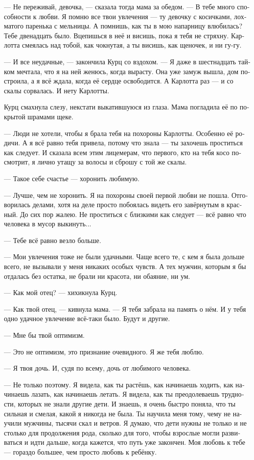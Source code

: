 \documentclass[a4paper,12pt,fleqn]{book}\usepackage{cooltooltips}\usepackage{polyglossia}\setdefaultlanguage[babelshorthands=true]{russian}\setotherlanguage{english}\defaultfontfeatures{Ligatures=TeX,Mapping=tex-text} \usepackage{xcolor}\definecolor{lightgray}{HTML}{bbbbbb}\color{lightgray}\newcommand{\ml}[3]{\textenglish{\textcolor{black}{#3}}}
\begin{document}
--- Не переживай, девочка, --- сказала тогда мама за обедом.
--- В тебе много способности к любви.
Я помню все твои увлечения --- ту девочку с косичками, лохматого паренька с мельницы.
А помнишь, как ты в мою напарницу влюбилась?
Тебе двенадцать было.
Вцепишься в неё и висишь, пока я тебя не стряхну.
Карлотта смеялась над тобой, как чокнутая, а ты висишь, как щеночек, и ни гу-гу.

--- И все неудачные, --- закончила Курц со вздохом.
--- Я даже в шестнадцать тайком мечтала, что я на ней женюсь, когда вырасту.
Она уже замуж вышла, дом построила, а я всё ждала, когда её сердце освободится.
А Карлотта раз --- и со скалы сорвалась.
И нету Карлотты.

Курц смахнула слезу, некстати выкатившуюся из глаза.
Мама погладила её по покрытой шрамами щеке.

--- Люди не хотели, чтобы я брала тебя на похороны Карлотты.
Особенно её родичи.
А я всё равно тебя привела, потому что знала --- ты захочешь проститься как следует.
И сказала всем этим лицемерам, что первого, кто на тебя косо посмотрит, я лично утащу за волосы и сброшу с той же скалы.

--- Такое себе счастье --- хоронить любимую.

--- Лучше, чем не хоронить.
Я на похороны своей первой любви не пошла.
Отговорилась делами, хотя на деле просто побоялась видеть его завёрнутым в красный.
До сих пор жалею.
Не проститься с близкими как следует --- всё равно что человека в мусор выкинуть...

--- Тебе всё равно везло больше.

--- Мои увлечения тоже не были удачными.
Чаще всего те, с кем я была дольше всего, не вызывали у меня никаких особых чувств.
А тех мужчин, которым я бы отдалась без остатка, не брали ни красота, ни обаяние, ни ум.

--- Как мой отец? --- хихикнула Курц.

--- Как твой отец, --- кивнула мама.
--- Я тебя забрала на память о нём.
И у тебя одно удачное увлечение всё-таки было.
Будут и другие.

--- Мне бы твой оптимизм.

--- Это не оптимизм, это признание очевидного.
Я же тебя люблю.

--- Я твоя дочь.
И, судя по всему, дочь от любимого человека.

--- Не только поэтому.
Я видела, как ты растёшь, как начинаешь ходить, как начинаешь лазать, как начинаешь летать.
Я видела, как ты преодолеваешь трудности, которых не знали другие дети.
И знаешь, я очень быстро поняла, что ты сильная и смелая, какой я никогда не была.
Ты научила меня тому, чему не научили мужчины, тысячи скал и ветров.
Я думаю, что дети нужны не только и не столько для продолжения рода, сколько для того, чтобы взрослые могли развиваться и идти дальше, когда кажется, что путь уже закончен.
Моя любовь к тебе --- гораздо большее, чем просто любовь к ребёнку.
\end{document}
